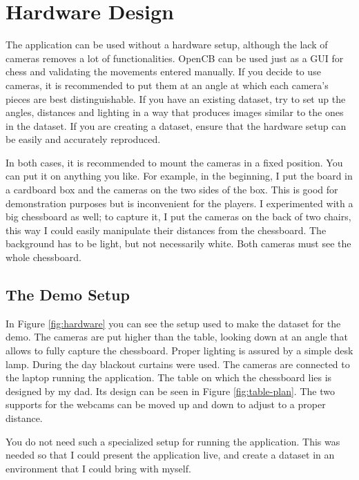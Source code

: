 \section{Hardware Design} \label{sec:hardware-design}

The application can be used without a hardware setup, although the lack of cameras removes a lot of functionalities. OpenCB can be used just as a GUI for chess and validating the movements entered manually. If you decide to use cameras, it is recommended to put them at an angle at which each camera's pieces are best distinguishable. If you have an existing dataset, try to set up the angles, distances and lighting in a way that produces images similar to the ones in the dataset. If you are creating a dataset, ensure that the hardware setup can be easily and accurately reproduced.

In both cases, it is recommended to mount the cameras in a fixed position. You can put it on anything you like. For example, in the beginning, I put the board in a cardboard box and the cameras on the two sides of the box. This is good for demonstration purposes but is inconvenient for the players. I experimented with a big chessboard as well; to capture it, I put the cameras on the back of two chairs, this way I could easily manipulate their distances from the chessboard. The background has to be light, but not necessarily white. Both cameras must see the whole chessboard.



\subsection{The Demo Setup}

In Figure \ref{fig:hardware} you can see the setup used to make the dataset for the demo. The cameras are put higher than the table, looking down at an angle that allows to fully capture the chessboard. Proper lighting is assured by a simple desk lamp. During the day blackout curtains were used. The cameras are connected to the laptop running the application. The table on which the chessboard lies is designed by my dad. Its design can be seen in Figure \ref{fig:table-plan}. The two supports for the webcams can be moved up and down to adjust to a proper distance.

You do not need such a specialized setup for running the application. This was needed so that I could present the application live, and create a dataset in an environment that I could bring with myself.

